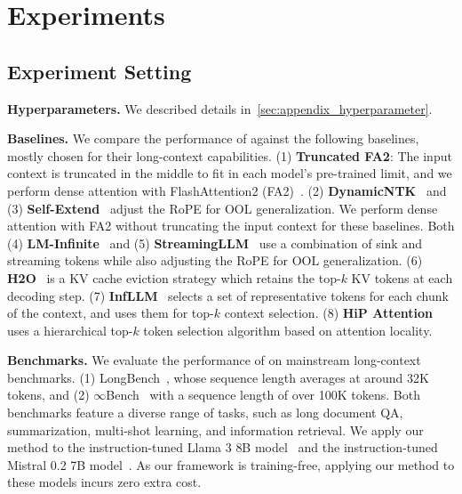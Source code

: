 \section{Experiments}
\label{sec:experiments}

\subsection{Experiment Setting}
\label{sec:exp_setting}

\textbf{Hyperparameters.}
We described details in~\cref{sec:appendix_hyperparameter}.

\textbf{Baselines.}
We compare the performance of \ours against the following baselines, mostly chosen for their long-context capabilities.
(1) \textbf{Truncated FA2}: The input context is truncated in the middle to fit in each model's pre-trained limit, and we perform dense attention with FlashAttention2 (FA2)~\citep{dao_flashattention_2022}.
(2) \textbf{DynamicNTK}~\citep{bloc97_ntk-aware_2023} and (3) \textbf{Self-Extend}~\citep{jin_llm_2024} adjust the RoPE for OOL generalization. We perform dense attention with FA2 without truncating the input context for these baselines.
Both (4) \textbf{LM-Infinite}~\citep{han_lm-infinite_2024} and (5) \textbf{StreamingLLM}~\citep{xiao_efficient_2024} use a combination of sink and streaming tokens while also adjusting the RoPE for OOL generalization.
(6) \textbf{H2O}~\citep{zhang_h_2o_2023} is a KV cache eviction strategy which retains the top-$k$ KV tokens at each decoding step. 
(7) \textbf{InfLLM}~\citep{xiao_infllm_2024} selects a set of representative tokens for each chunk of the context, and uses them for top-$k$ context selection.
(8) \textbf{HiP Attention}~\citep{lee_training-free_2024} uses a hierarchical top-$k$ token selection algorithm based on attention locality.

\textbf{Benchmarks.}
We evaluate the performance of \ours on mainstream long-context benchmarks. 
(1) LongBench~\citep{bai_longbench_2023}, whose sequence length averages at around 32K tokens, 
and (2) $\infty$Bench~\citep{zhang_inftybench_2024} with a sequence length of over 100K tokens. 
Both benchmarks feature a diverse range of tasks, such as long document QA, summarization, multi-shot learning, and information retrieval.
We apply our method to the instruction-tuned Llama 3 8B model~\citep{grattafiori_llama_2024} and the instruction-tuned Mistral 0.2 7B model~\citep{jiang_mistral_2023}. As our framework is training-free, applying our method to these models incurs zero extra cost.

